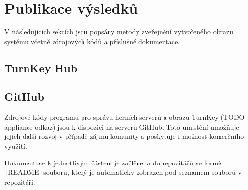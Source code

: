 \chapter{Publikace výsledků}

V následujících sekcích jsou popsány metody zveřejnění vytvořeného obrazu systému včetně zdrojových kódů
a příslušné dokumentace.

\section{TurnKey Hub}

\section{GitHub}

Zdrojové kódy programu pro správu herních serverů \cite{github_linux_gameservers} a obrazu TurnKey (TODO appliance odkaz)
jsou k dispozici na serveru GitHub. Toto umístění umožňuje jejich další rozvoj v případě zájmu komunity a poskytuje i
možnost komerčního využití.

Dokumentace k jednotlivým částem je začlěnena do repozitářů ve formě \texttt|README| souboru, který je automaticky zobrazen
pod seznamem souborů v repozitáři.